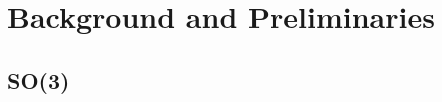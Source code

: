 \iffalse
\chapter{Background and {Preliminaries}}

\section{$\operatorname{SO}(3)$}

\begin{subequations}
\label{eq:bp:so3:rotations}
\begin{align}
    \bm{R}_x(\theta) &= \begin{bmatrix}
        1 & 0 & 0 \\
        0 & \cos(\theta) & -\sin(\theta) \\
        0 & \sin(\theta) & \cos(\theta)
    \end{bmatrix}, \\
    \bm{R}_y(\theta) &= \begin{bmatrix}
        \cos(\theta) & 0 & \sin(\theta) \\
        0 & 1 & 0 \\
        -\sin(\theta) & 0 & \cos(\theta)
    \end{bmatrix}, \\
    \bm{R}_z(\theta) &= \begin{bmatrix}
        \cos(\theta) & -\sin(\theta) & 0 \\
        \sin(\theta) & \cos(\theta) & 0 \\
        0 & 0 & 1
    \end{bmatrix}.
\end{align}
\end{subequations}

\section{$\operatorname{SE}(3)$}
\fi

\chapter{Background and {Preliminaries}}

\section{SO(3)}
\label{sec:bp:so3_se3}

